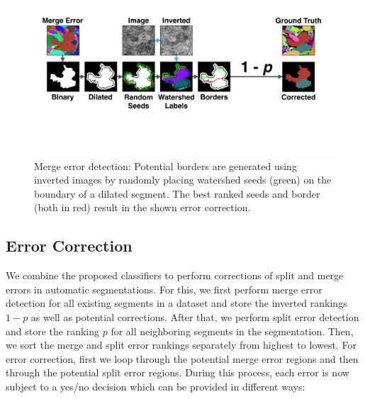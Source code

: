 
\begin{figure}[t]
\centering
\includegraphics[width=\linewidth]{gfx/merge_error_v6.pdf}
\caption{Merge error detection: Potential borders are generated using inverted images by randomly placing watershed seeds (green) on the boundary of a dilated segment. The best ranked seeds and border (both in red) result in the shown error correction.}
\label{fig:merge_error}
\end{figure}

\subsection{Error Correction}
\label{sec:errorcorrection}

We combine the proposed classifiers to perform corrections of split and merge errors in automatic segmentations. For this, we first perform merge error detection for all existing segments in a dataset and store the inverted rankings $1-p$ as well as potential corrections. After that, we perform split error detection and store the ranking $p$ for all neighboring segments in the segmentation. Then, we sort the merge and split error rankings separately from highest to lowest. For error correction, first we loop through the potential merge error regions and then through the potential split error regions. During this process, each error is now subject to a yes/no decision which can be provided in different ways:

